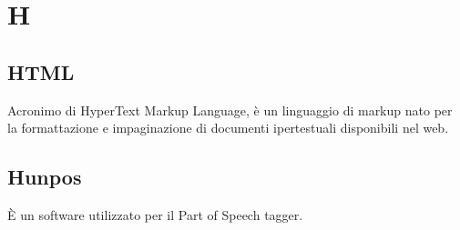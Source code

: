 \section*{H}

\subsection{HTML}
Acronimo di HyperText Markup Language,  è un linguaggio di markup nato per la formattazione e impaginazione di documenti ipertestuali disponibili nel web.

\subsection{Hunpos}
È un software utilizzato per il Part of Speech tagger.